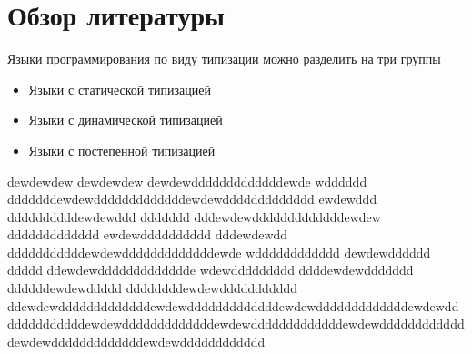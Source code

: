 \section{Обзор литературы}
Языки программирования по виду типизации можно разделить на три группы
\begin{itemize}
\itemsep-1mm
\item Языки с статической типизацией
\item Языки с динамической типизацией
\item Языки с постепенной типизацией
\end{itemize}
dewdewdew
dewdewdew
dewdewdddddddddddddewde wdddddd dddddddewdewdddddddddddddewdewddddddddddddd ewdewddd ddddddddddewdewddd ddddddd dddewdewdddddddddddddewdew ddddddddddddd ewdewdddddddddd  dddewdewdd dddddddddddewdewdddddddddddddewde wdddddddddddd dewdewdddddd ddddd ddewdewddddddddddddde wdewddddddddd ddddewdewddddddd ddddddewdewddddd  ddddddddewdewddddddddddd ddewdewdddddddddddddewdewdddddddddddddewdewdddddddddddddewdewdddddddddddddewdewdddddddddddddewdewdddddddddddddewdewdddddddddddddewdewdddddddddddddewdewdddddddddddd 